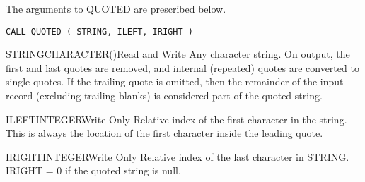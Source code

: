 The arguments to QUOTED are prescribed below.

\verb+CALL QUOTED ( STRING, ILEFT, IRIGHT )+

\begin{argy}{STRING}{CHARACTER\last(\last)}{Read and Write}
Any character string. On output, the first and last quotes are removed, and
internal (repeated) quotes are converted to single quotes. If the trailing
quote is omitted, then the remainder of the input record (excluding trailing
blanks) is considered part of the quoted string.
\end{argy}

\begin{argy}{ILEFT}{INTEGER}{Write Only}
Relative index of the first character in the string. This is always the
location of the first character inside the leading quote.
\end{argy}

\begin{argy}{IRIGHT}{INTEGER}{Write Only}
Relative index of the last character in
STRING.  IRIGHT = 0 if the quoted string is null.
\end{argy}

